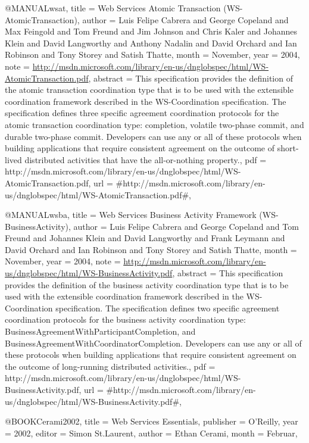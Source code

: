 @MANUAL{wsat,
  title = {{Web Services Atomic Transaction (WS-AtomicTransaction)}},
  author = {Luis Felipe Cabrera and George Copeland and Max Feingold and Tom
	Freund and Jim Johnson and Chris Kaler and Johannes Klein and David
	Langworthy and Anthony Nadalin and David Orchard and Ian Robinson
	and Tony Storey and Satish Thatte},
  month = {November},
  year = {2004},
  note = {\url{http://msdn.microsoft.com/library/en-us/dnglobspec/html/WS-AtomicTransaction.pdf}},
  abstract = {This specification provides the
definition of the atomic transaction
	coordination type that is to be
used with the extensible coordination
	framework described in the
WS-Coordination specification. The specification
	defines three specific
agreement coordination protocols for the atomic
	transaction coordination
type: completion, volatile two-phase commit,
	and durable two-phase
commit. Developers can use any or all of these
	protocols when building
applications that require consistent agreement
	on the outcome of
short-lived distributed activities that have the
	all-or-nothing property.},
  pdf = {http://msdn.microsoft.com/library/en-us/dnglobspec/html/WS-AtomicTransaction.pdf},
  url = {#http://msdn.microsoft.com/library/en-us/dnglobspec/html/WS-AtomicTransaction.pdf#},
}

@MANUAL{wsba,
  title = {{Web Services Business Activity Framework (WS-BusinessActivity)}},
  author = {Luis Felipe Cabrera and George Copeland and Tom Freund and Johannes
	Klein and David Langworthy and Frank Leymann and David Orchard and
	Ian Robinson and Tony Storey and Satish Thatte},
  month = {November},
  year = {2004},
  note = {\url{http://msdn.microsoft.com/library/en-us/dnglobspec/html/WS-BusinessActivity.pdf}},
  abstract = {This specification provides
the definition of the business activity
	coordination type that is
to be used with the extensible coordination
	framework described in
the WS-Coordination specification. The specification
	defines two
specific agreement coordination protocols for the business
	activity
coordination type: BusinessAgreementWithParticipantCompletion,
	and
BusinessAgreementWithCoordinatorCompletion. Developers can use
	any or all of
these protocols when building applications that require
	consistent
agreement on the outcome of long-running distributed activities.},
  pdf = {http://msdn.microsoft.com/library/en-us/dnglobspec/html/WS-BusinessActivity.pdf},
  url = {#http://msdn.microsoft.com/library/en-us/dnglobspec/html/WS-BusinessActivity.pdf#},
}

@BOOK{Cerami2002,
  title = {{Web Services Essentials}},
  publisher = {O'Reilly},
  year = {2002},
  editor = {Simon St.Laurent},
  author = {Ethan Cerami},
  month = {Februar},
}

